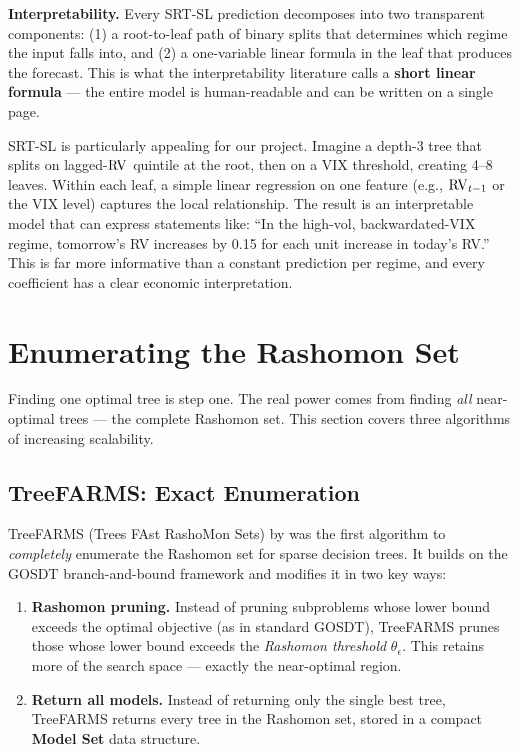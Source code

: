 \textbf{Interpretability.}  Every SRT-SL prediction decomposes into two
transparent components: (1) a root-to-leaf path of binary splits that
determines which regime the input falls into, and (2) a one-variable
linear formula in the leaf that produces the forecast.  This is what the
interpretability literature calls a \textbf{short linear formula} --- the
entire model is human-readable and can be written on a single page.

\begin{projectconnection}
SRT-SL is particularly appealing for our project.  Imagine a depth-3 tree
that splits on lagged-$\operatorname{RV}$ quintile at the root, then on a VIX threshold,
creating 4--8 leaves.  Within each leaf, a simple linear regression on one
feature (e.g., $\operatorname{RV}_{t-1}$ or the VIX level) captures the local
relationship.  The result is an interpretable model that can express
statements like: ``In the high-vol, backwardated-VIX regime, tomorrow's RV
increases by 0.15 for each unit increase in today's RV.''  This is far more
informative than a constant prediction per regime, and every coefficient
has a clear economic interpretation.
\end{projectconnection}


\section{Enumerating the Rashomon Set}\label{sec:rashomon:enumeration}

Finding one optimal tree is step one.  The real power comes from finding
\emph{all} near-optimal trees --- the complete Rashomon set.  This section
covers three algorithms of increasing scalability.

\subsection{TreeFARMS: Exact Enumeration}\label{sec:rashomon:treefarms}

TreeFARMS (Trees FAst RashoMon Sets) by \citet{XinEtAl2022} was the first
algorithm to \emph{completely} enumerate the Rashomon set for sparse decision
trees.  It builds on the GOSDT branch-and-bound framework and modifies it in
two key ways:

\begin{enumerate}[leftmargin=1.8em]
  \item \textbf{Rashomon pruning.}  Instead of pruning subproblems whose
    lower bound exceeds the optimal objective (as in standard GOSDT),
    TreeFARMS prunes those whose lower bound exceeds the \emph{Rashomon
    threshold} $\theta_\epsilon$.  This retains more of the search space ---
    exactly the near-optimal region.

  \item \textbf{Return all models.}  Instead of returning only the single
    best tree, TreeFARMS returns every tree in the Rashomon set, stored in a
    compact \textbf{Model Set} data structure.
\end{enumerate}

